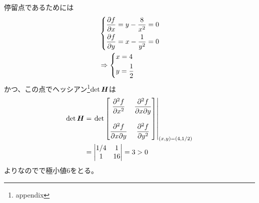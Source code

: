 \begin{ans*}
  停留点であるためには
  \begin{align}
    &\begin{dcases*}
      \ppar{f}{x} = y - \frac{8}{x^2} = 0 \\
      \ppar{f}{y} = x - \frac{1}{y^2} = 0
    \end{dcases*}\\
    &\Rightarrow
    \begin{dcases*}
      x = 4 \\
      y = \frac{1}{2}
    \end{dcases*}
  \end{align}
  かつ、この点でヘッシアン\footnote{appendix}$\det\bm{H}$は
  \begin{align}
    \det\bm{H}
    &=
    \left.
    \det
    \begin{bmatrix}
    \displaystyle\frac{\partial^2f}{\partial x^2} & \displaystyle\frac{\partial^2f}{\partial x\partial y} \\
    \\
    \displaystyle\frac{\partial^2f}{\partial x\partial y} & \displaystyle\frac{\partial^2f}{\partial y^2}
    \end{bmatrix}\right|_{(x,y) = (4,1/2)} \\
    &=
    \begin{vmatrix}
      1/4 & 1 \\
      1 & 16
    \end{vmatrix}
    = 3 > 0
  \end{align}
  よりなのでで極小値6をとる。
\end{ans*}

